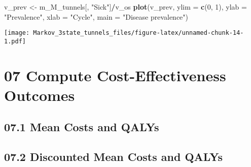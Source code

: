\documentclass[
]{article}
\newenvironment{Shaded}{\begin{snugshade}}{\end{snugshade}}
\newcommand{\CommentTok}[1]{\textcolor[rgb]{0.56,0.35,0.01}{\textit{#1}}}
\newcommand{\DataTypeTok}[1]{\textcolor[rgb]{0.13,0.29,0.53}{#1}}
\newcommand{\DecValTok}[1]{\textcolor[rgb]{0.00,0.00,0.81}{#1}}
\newcommand{\KeywordTok}[1]{\textcolor[rgb]{0.13,0.29,0.53}{\textbf{#1}}}
\newcommand{\NormalTok}[1]{#1}
\newcommand{\OperatorTok}[1]{\textcolor[rgb]{0.81,0.36,0.00}{\textbf{#1}}}
\newcommand{\StringTok}[1]{\textcolor[rgb]{0.31,0.60,0.02}{#1}}
\begin{document}
\begin{Shaded}
\begin{Highlighting}[]
\NormalTok{v_prev <-}\StringTok{ }\NormalTok{m_M_tunnels[, }\StringTok{"Sick"}\NormalTok{]}\OperatorTok{/}\NormalTok{v_os}
\KeywordTok{plot}\NormalTok{(v_prev,}
     \DataTypeTok{ylim =} \KeywordTok{c}\NormalTok{(}\DecValTok{0}\NormalTok{, }\DecValTok{1}\NormalTok{),}
     \DataTypeTok{ylab =} \StringTok{"Prevalence"}\NormalTok{,}
     \DataTypeTok{xlab =} \StringTok{"Cycle"}\NormalTok{,}
     \DataTypeTok{main =} \StringTok{"Disease prevalence"}\NormalTok{)}
\end{Highlighting}
\end{Shaded}

\texttt{[image: Markov\_3state\_tunnels\_files/figure-latex/unnamed-chunk-14-1.pdf]}

\hypertarget{compute-cost-effectiveness-outcomes}{%
\section{07 Compute Cost-Effectiveness
Outcomes}\label{compute-cost-effectiveness-outcomes}}

\hypertarget{mean-costs-and-qalys}{%
\subsection{07.1 Mean Costs and QALYs}\label{mean-costs-and-qalys}}

\begin{Shaded}
\end{Shaded}

\hypertarget{discounted-mean-costs-and-qalys}{%
\subsection{07.2 Discounted Mean Costs and
QALYs}\label{discounted-mean-costs-and-qalys}}
\end{document}
